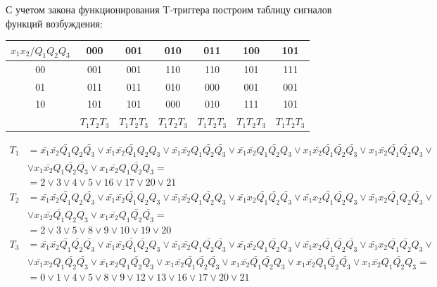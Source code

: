 \documentclass[listings]{labreport}
\begin{document}
С учетом закона функционирования T-триггера построим таблицу
сигналов функций возбуждения:

\begin{tabular}{|*{7}{c|}}
\hline
$x_1x_2/Q_1Q_2Q_3$ & 000 & 001 & 010 & 011 & 100 & 101\\\hline
00 & 001 & 001 & 110 & 110 & 101 & 111\\\hline
01 & 011 & 011 & 010 & 000 & 001 & 001\\\hline
10 & 101 & 101 & 000 & 010 & 111 & 101\\\hline
 & $T_1T_2T_3$ & $T_1T_2T_3$ & $T_1T_2T_3$ & $T_1T_2T_3$ & $T_1T_2T_3$ & $T_1T_2T_3$\\\hline
\end{tabular}

\begin{align*}
T_1 & = \bar{x_1}\bar{x_2}\bar{Q_1}Q_2\bar{Q_3} \lor \bar{x_1}\bar{x_2}\bar{Q_1}Q_2Q_3 \lor \bar{x_1}\bar{x_2}Q_1\bar{Q_2}\bar{Q_3} \lor \bar{x_1}\bar{x_2}Q_1\bar{Q_2}Q_3 \lor x_1\bar{x_2}\bar{Q_1}\bar{Q_2}\bar{Q_3} \lor x_1\bar{x_2}\bar{Q_1}\bar{Q_2}Q_3 \lor \\ & \lor x_1\bar{x_2}Q_1\bar{Q_2}\bar{Q_3} \lor x_1\bar{x_2}Q_1\bar{Q_2}Q_3 = \\ & = 2 \lor 3 \lor 4 \lor 5 \lor 16 \lor 17 \lor 20 \lor 21 \\
T_2 & = \bar{x_1}\bar{x_2}\bar{Q_1}Q_2\bar{Q_3} \lor \bar{x_1}\bar{x_2}\bar{Q_1}Q_2Q_3 \lor \bar{x_1}\bar{x_2}Q_1\bar{Q_2}Q_3 \lor \bar{x_1}x_2\bar{Q_1}\bar{Q_2}\bar{Q_3} \lor \bar{x_1}x_2\bar{Q_1}\bar{Q_2}Q_3 \lor \bar{x_1}x_2\bar{Q_1}Q_2\bar{Q_3} \lor \\ & \lor x_1\bar{x_2}\bar{Q_1}Q_2Q_3 \lor x_1\bar{x_2}Q_1\bar{Q_2}\bar{Q_3}   = \\ & = 2 \lor 3 \lor 5 \lor 8 \lor 9 \lor 10 \lor 19 \lor 20 \\
T_3 & = \bar{x_1}\bar{x_2}\bar{Q_1}\bar{Q_2}\bar{Q_3} \lor \bar{x_1}\bar{x_2}\bar{Q_1}\bar{Q_2}Q_3 \lor \bar{x_1}\bar{x_2}Q_1\bar{Q_2}\bar{Q_3} \lor \bar{x_1}\bar{x_2}Q_1\bar{Q_2}Q_3 \lor \bar{x_1}x_2\bar{Q_1}\bar{Q_2}\bar{Q_3} \lor \bar{x_1}x_2\bar{Q_1}\bar{Q_2}Q_3 \lor \\ & \lor \bar{x_1}x_2Q_1\bar{Q_2}\bar{Q_3} \lor \bar{x_1}x_2Q_1\bar{Q_2}Q_3 \lor x_1\bar{x_2}\bar{Q_1}\bar{Q_2}\bar{Q_3} \lor x_1\bar{x_2}\bar{Q_1}\bar{Q_2}Q_3 \lor x_1\bar{x_2}Q_1\bar{Q_2}\bar{Q_3} \lor x_1\bar{x_2}Q_1\bar{Q_2}Q_3 = \\ & = 0 \lor 1 \lor 4 \lor 5 \lor 8 \lor 9 \lor 12 \lor 13 \lor 16 \lor 17 \lor 20 \lor 21
\end{align*}
\end{document}
